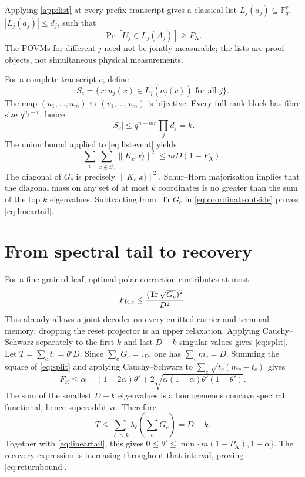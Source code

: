 \documentclass[10pt,twocolumn]{article}
\theoremstyle{remark}
\newcommand{\Tr}{\operatorname{Tr}}
\newcommand{\id}{\mathbb I}
\newcommand{\ket}[1]{\lvert #1\rangle}
\newcommand{\PA}{P_{\mathrm A}}
\newcommand{\FR}{F_{\mathrm R}}
\begin{document}
Applying \cref{app:list} at every prefix transcript gives a classical list
$L_j(a_j)\subseteq\mathbb F_q^r$, $|L_j(a_j)|\leq d_j$, such that
\begin{equation}
\Pr[U_j\in L_j(A_j)]\geq\PA.
\label{eq:listevent}
\end{equation}
The POVMs for different $j$ need not be jointly measurable; the lists are
proof objects, not simultaneous physical measurements.

For a complete transcript $c$, define
\begin{equation}
S_c=\{x:u_j(x)\in L_j(a_j(c))\text{ for all }j\}.
\end{equation}
The map $(u_1,\ldots,u_m)\leftrightarrow(v_1,\ldots,v_m)$ is bijective.
Every full-rank block has fibre size $q^{n_j-r}$, hence
\begin{equation}
|S_c|\leq q^{n-mr}\prod_jd_j=k.
\end{equation}
The union bound applied to \eqref{eq:listevent} yields
\begin{equation}
\sum_c\sum_{x\notin S_c}\lVert K_c\ket{x}\rVert^2
\leq mD(1-\PA).
\label{eq:coordinateoutside}
\end{equation}
The diagonal of $G_c$ is precisely
$\lVert K_c\ket{x}\rVert^2$. Schur--Horn majorisation implies that the
diagonal mass on any set of at most $k$ coordinates is no greater than the
sum of the top $k$ eigenvalues. Subtracting from $\Tr G_c$ in
\eqref{eq:coordinateoutside} proves \eqref{eq:lineartail}.

\section{From spectral tail to recovery}
\label{app:recovery}

For a fine-grained leaf, optimal polar correction contributes at most
\begin{equation}
F_{{\rm R},c}\leq\frac{(\Tr\sqrt{G_c})^2}{D^2}.
\label{eq:polar}
\end{equation}
This already allows a joint decoder on every emitted carrier and terminal
memory; dropping the reset projector is an upper relaxation. Applying
Cauchy--Schwarz separately to the first $k$ and last $D-k$ singular values
gives \eqref{eq:split}. Let $T=\sum_ct_c=\theta'D$. Since
$\sum_cG_c=\id_D$, one has $\sum_cm_c=D$. Summing the square of
\eqref{eq:split} and applying Cauchy--Schwarz to
$\sum_c\sqrt{t_c(m_c-t_c)}$ gives
\begin{equation}
\FR\leq\alpha+(1-2\alpha)\theta'
+2\sqrt{\alpha(1-\alpha)\theta'(1-\theta')}.
\end{equation}
The sum of the smallest $D-k$ eigenvalues is a homogeneous concave spectral
functional, hence superadditive. Therefore
\begin{equation}
T\leq\sum_{\ell>k}\lambda_\ell\!\left(\sum_cG_c\right)=D-k.
\end{equation}
Together with \eqref{eq:lineartail}, this gives
$0\leq\theta'\leq\min\{m(1-\PA),1-\alpha\}$. The recovery expression is
increasing throughout that interval, proving \eqref{eq:returnbound}.
\end{document}
